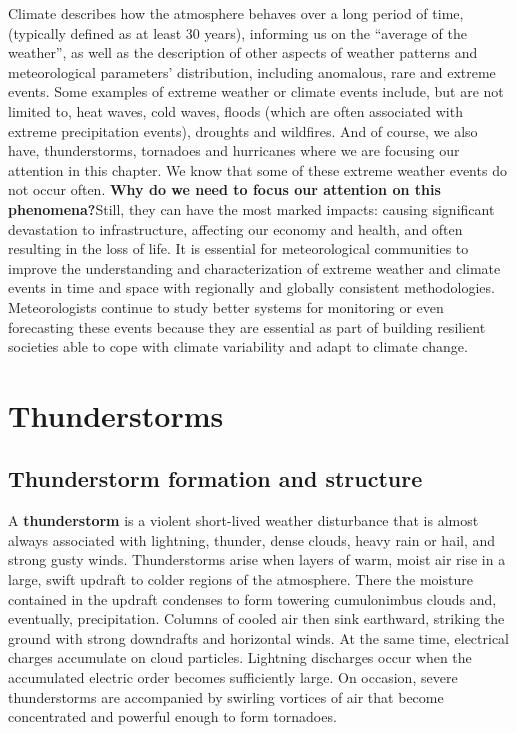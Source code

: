 \documentclass[12pt,oneside]{book}
\begin{document}
Climate describes how the atmosphere behaves over a long period of time,
(typically defined as at least 30 years), informing us on the ``average
of the weather'', as well as the description of other aspects of weather
patterns and meteorological parameters' distribution, including
anomalous, rare and extreme events. Some examples of extreme weather or
climate events include, but are not limited to, heat waves, cold waves,
floods (which are often associated with extreme precipitation events),
droughts and wildfires. And of course, we also have, thunderstorms,
tornadoes and hurricanes where we are focusing our attention in this
chapter. We know that some of these extreme weather events do not occur
often. \textbf{Why do we need to focus our attention on this
phenomena?}Still, they can have the most marked impacts: causing
significant devastation to infrastructure, affecting our economy and
health, and often resulting in the loss of life. It is essential for
meteorological communities to improve the understanding and
characterization of extreme weather and climate events in time and space
with regionally and globally consistent methodologies. Meteorologists
continue to study better systems for monitoring or even forecasting
these events because they are essential as part of building resilient
societies able to cope with climate variability and adapt to climate
change.

\section{Thunderstorms}\label{thunderstorms}

\subsection{Thunderstorm formation and
structure}\label{thunderstorm-formation-and-structure}

A \textbf{thunderstorm} is a violent short-lived weather disturbance
that is almost always associated with lightning, thunder, dense clouds,
heavy rain or hail, and strong gusty winds. Thunderstorms arise when
layers of warm, moist air rise in a large, swift updraft to colder
regions of the atmosphere. There the moisture contained in the updraft
condenses to form towering cumulonimbus clouds and, eventually,
precipitation. Columns of cooled air then sink earthward, striking the
ground with strong downdrafts and horizontal winds. At the same time,
electrical charges accumulate on cloud particles. Lightning discharges
occur when the accumulated electric order becomes sufficiently large. On
occasion, severe thunderstorms are accompanied by swirling vortices of
air that become concentrated and powerful enough to form tornadoes.
\end{document}
